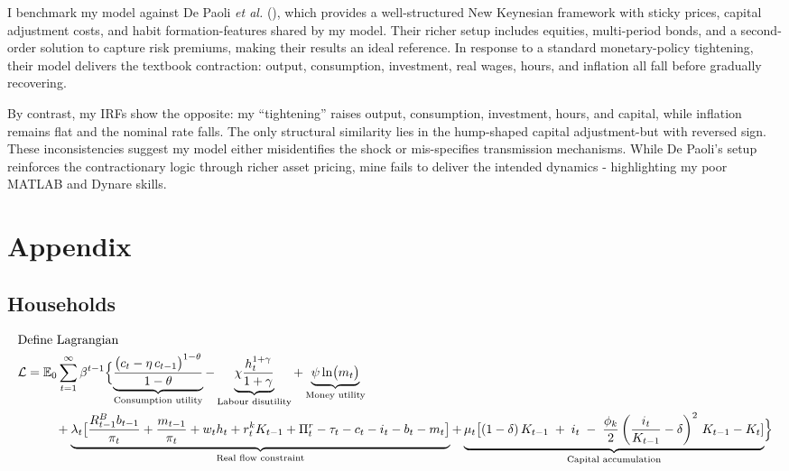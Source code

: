 \documentclass[11pt,preprint]{elsarticle}
\numberwithin{equation}{section}
\numberwithin{figure}{section}
\numberwithin{table}{section}
\begin{document}
I benchmark my model against De Paoli \emph{et al.}
(), which provides a well-structured New
Keynesian framework with sticky prices, capital adjustment costs, and
habit formation-features shared by my model. Their richer setup includes
equities, multi-period bonds, and a second-order solution to capture
risk premiums, making their results an ideal reference. In response to a
standard monetary-policy tightening, their model delivers the textbook
contraction: output, consumption, investment, real wages, hours, and
inflation all fall before gradually recovering.

By contrast, my IRFs show the opposite: my ``tightening'' raises output,
consumption, investment, hours, and capital, while inflation remains
flat and the nominal rate falls. The only structural similarity lies in
the hump-shaped capital adjustment-but with reversed sign. These
inconsistencies suggest my model either misidentifies the shock or
mis-specifies transmission mechanisms. While De Paoli's setup reinforces
the contractionary logic through richer asset pricing, mine fails to
deliver the intended dynamics - highlighting my poor MATLAB and Dynare
skills.

\newpage

\section{Appendix}\label{appendix}

\begingroup
\footnotesize

\subsection{Households}\label{households-1}

\begin{align*}
  & \text{Define Lagrangian} \\
  & \mathcal{L} = \mathbb{E}_0 \sum_{t=1}^{\infty} \beta^{t-1} \Bigl\{
    \underbrace{\frac{\bigl(c_t-\eta \, c_{t-1}\bigr)^{1-\theta}}{1-\theta}}_{\text{Consumption utility}}
    - \underbrace{\chi\frac{h_t^{1+\gamma}}{1+\gamma}}_{\text{Labour disutility}}
    + \underbrace{\psi\ln\bigl(m_t\bigr)}_{\text{Money utility}} \\
  & \quad\qquad
    + \underbrace{\lambda_t\bigl[\dfrac{R^B_{t-1}b_{t-1}}{\pi_t} + \dfrac{m_{t-1}}{\pi_t} + w_t h_t + r^k_t K_{t-1} + \Pi^r_t - \tau_t -c_t - i_t - b_t - m_t\bigr]}_{\text{Real flow constraint}}
    + \underbrace{\mu_t\bigl[(1 - \delta)\,K_{t-1}
\;+\; i_t
\;-\;\frac{\phi_k}{2}
\left(\frac{i_t}{K_{t-1}} - \delta\right)^{2}
\,K_{t-1} - K_t]}_{\text{Capital accumulation}}
  \Bigr\}
\end{align*}
\end{document}

